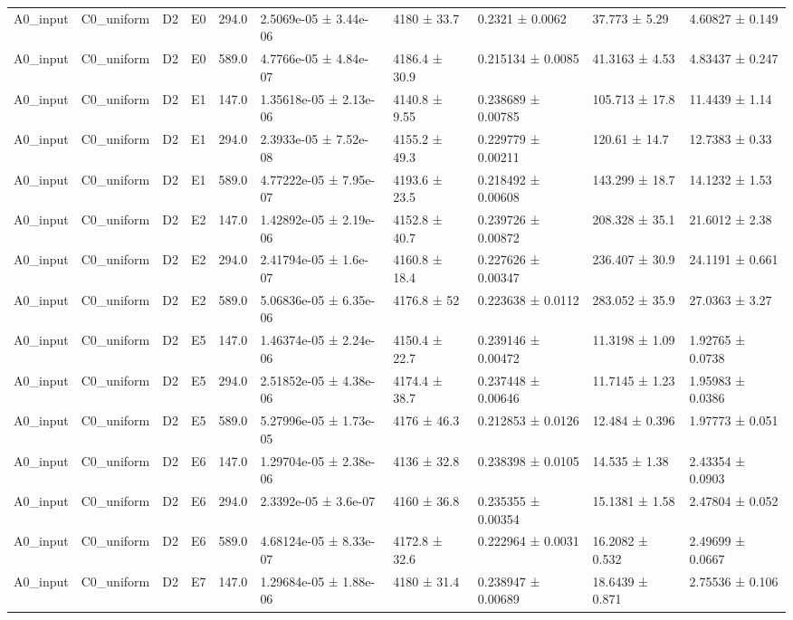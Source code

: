 \begin{table}
\begin{tabular}{llllllllll}
A0\_input & C0\_uniform & D2 & E0 & 294.0 & 2.5069e-05 ± 3.44e-06 & 4180 ± 33.7 & 0.2321 ± 0.0062 & 37.773 ± 5.29 & 4.60827 ± 0.149 \\
A0\_input & C0\_uniform & D2 & E0 & 589.0 & 4.7766e-05 ± 4.84e-07 & 4186.4 ± 30.9 & 0.215134 ± 0.0085 & 41.3163 ± 4.53 & 4.83437 ± 0.247 \\
A0\_input & C0\_uniform & D2 & E1 & 147.0 & 1.35618e-05 ± 2.13e-06 & 4140.8 ± 9.55 & 0.238689 ± 0.00785 & 105.713 ± 17.8 & 11.4439 ± 1.14 \\
A0\_input & C0\_uniform & D2 & E1 & 294.0 & 2.3933e-05 ± 7.52e-08 & 4155.2 ± 49.3 & 0.229779 ± 0.00211 & 120.61 ± 14.7 & 12.7383 ± 0.33 \\
A0\_input & C0\_uniform & D2 & E1 & 589.0 & 4.77222e-05 ± 7.95e-07 & 4193.6 ± 23.5 & 0.218492 ± 0.00608 & 143.299 ± 18.7 & 14.1232 ± 1.53 \\
A0\_input & C0\_uniform & D2 & E2 & 147.0 & 1.42892e-05 ± 2.19e-06 & 4152.8 ± 40.7 & 0.239726 ± 0.00872 & 208.328 ± 35.1 & 21.6012 ± 2.38 \\
A0\_input & C0\_uniform & D2 & E2 & 294.0 & 2.41794e-05 ± 1.6e-07 & 4160.8 ± 18.4 & 0.227626 ± 0.00347 & 236.407 ± 30.9 & 24.1191 ± 0.661 \\
A0\_input & C0\_uniform & D2 & E2 & 589.0 & 5.06836e-05 ± 6.35e-06 & 4176.8 ± 52 & 0.223638 ± 0.0112 & 283.052 ± 35.9 & 27.0363 ± 3.27 \\
A0\_input & C0\_uniform & D2 & E5 & 147.0 & 1.46374e-05 ± 2.24e-06 & 4150.4 ± 22.7 & 0.239146 ± 0.00472 & 11.3198 ± 1.09 & 1.92765 ± 0.0738 \\
A0\_input & C0\_uniform & D2 & E5 & 294.0 & 2.51852e-05 ± 4.38e-06 & 4174.4 ± 38.7 & 0.237448 ± 0.00646 & 11.7145 ± 1.23 & 1.95983 ± 0.0386 \\
A0\_input & C0\_uniform & D2 & E5 & 589.0 & 5.27996e-05 ± 1.73e-05 & 4176 ± 46.3 & 0.212853 ± 0.0126 & 12.484 ± 0.396 & 1.97773 ± 0.051 \\
A0\_input & C0\_uniform & D2 & E6 & 147.0 & 1.29704e-05 ± 2.38e-06 & 4136 ± 32.8 & 0.238398 ± 0.0105 & 14.535 ± 1.38 & 2.43354 ± 0.0903 \\
A0\_input & C0\_uniform & D2 & E6 & 294.0 & 2.3392e-05 ± 3.6e-07 & 4160 ± 36.8 & 0.235355 ± 0.00354 & 15.1381 ± 1.58 & 2.47804 ± 0.052 \\
A0\_input & C0\_uniform & D2 & E6 & 589.0 & 4.68124e-05 ± 8.33e-07 & 4172.8 ± 32.6 & 0.222964 ± 0.0031 & 16.2082 ± 0.532 & 2.49699 ± 0.0667 \\
A0\_input & C0\_uniform & D2 & E7 & 147.0 & 1.29684e-05 ± 1.88e-06 & 4180 ± 31.4 & 0.238947 ± 0.00689 & 18.6439 ± 0.871 & 2.75536 ± 0.106 \\

\end{tabular}
\end{table}
